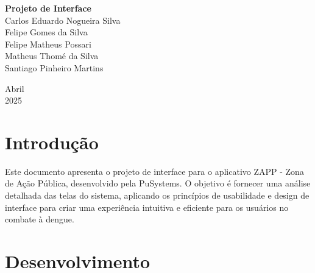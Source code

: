 \documentclass[a5paper, 12pt]{article}
\begin{document}
\begin{titlepage}
	\begin{center}
	
	\begin{figure}[!ht]
	\centering
    \end{figure}

	\vspace{115pt}
    \textbf{\Huge{Projeto de Interface}}\\
        
	\vspace{115pt}
    Carlos Eduardo Nogueira Silva \\
    Felipe Gomes da Silva \\
    Felipe Matheus Possari \\
    Matheus Thomé da Silva\\ 
    Santiago Pinheiro Martins \\
	\end{center}
	
	\vspace{1cm}
	\begin{center}
		\vspace{\fill}
		Abril \\
		2025
	\end{center}
\end{titlepage}

\newpage
\thispagestyle{empty}
\tableofcontents

\newpage
\pagestyle{fancy}
\fancyhead[L]{\thepage}
\fancyhead[C]{\nouppercase{\leftmark}}
\fancyfoot[R]{}
\fancyfoot[L]{}
\setlength\headheight{26pt}

\section{Introdução}
Este documento apresenta o projeto de interface para o aplicativo ZAPP - Zona de Ação Pública, desenvolvido pela PuSystems. O objetivo é fornecer uma análise detalhada das telas do sistema, aplicando os princípios de usabilidade e design de interface para criar uma experiência intuitiva e eficiente para os usuários no combate à dengue.

\section{Desenvolvimento}
\end{document}
